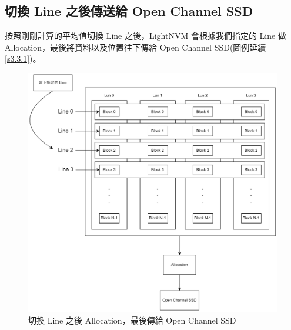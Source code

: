 \subsection{切換 Line 之後傳送給 Open Channel SSD}\label{s3.3.2}
\indent
按照剛剛計算的平均值切換 Line 之後，LightNVM 會根據我們指定的 Line 做 Allocation，最後將資料以及位置往下傳給 Open Channel SSD(圖例延續 \ref{s3.3.1})。
\begin{figure}[H]
    \centering
    \includegraphics[width=1\textwidth]{picture/ch3/switch_line_to_opssd.drawio.png}
    \caption{切換 Line 之後 Allocation，最後傳給 Open Channel SSD}
    \label{f3.7}
\end{figure}


